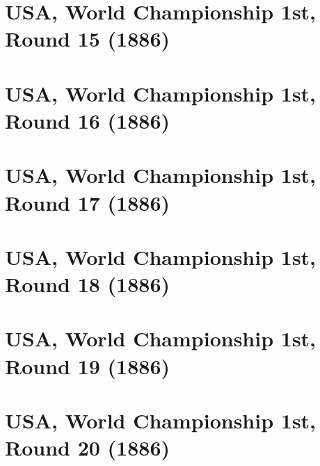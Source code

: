 \documentclass[11pt]{article}
\newcommand*\cleartoleftpage{%
   \clearpage
   \ifodd\value{page}\hbox{}\newpage\fi
}
\begin{document}
\cleartoleftpage

\section{USA, World Championship 1st, Round 15 (1886)}


\cleartoleftpage

\section{USA, World Championship 1st, Round 16 (1886)}


\cleartoleftpage

\section{USA, World Championship 1st, Round 17 (1886)}


\cleartoleftpage

\section{USA, World Championship 1st, Round 18 (1886)}


\cleartoleftpage

\section{USA, World Championship 1st, Round 19 (1886)}


\cleartoleftpage

\section{USA, World Championship 1st, Round 20 (1886)}


\cleartoleftpage
\end{document}
